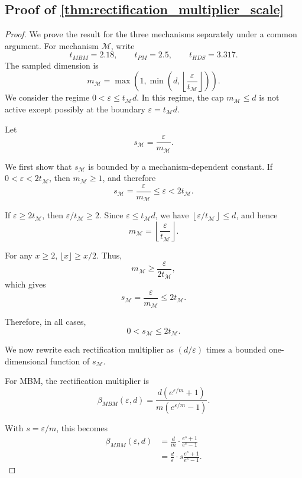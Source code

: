 \documentclass[conference,compsoc]{IEEEtran}
\theoremstyle{boldplain}
\theoremstyle{bolddefinition}
\theoremstyle{remark}
\newcommand{\mbmm}{MBM\xspace}
\newcommand{\pmm}{PM\xspace}
\newcommand{\hdsm}{HDS\xspace}
\begin{document}
\subsection{Proof of \autoref{thm:rectification_multiplier_scale}}
\label{app:proof_rectification_multiplier_scale}




\begin{proof}
We prove the result for the three mechanisms separately under a common
argument. For mechanism $\mathcal{M}$, write
$$
    t_{\mbmm}=2.18,\qquad
    t_{\pmm}=2.5,\qquad
    t_{\hdsm}=3.317.
$$
The sampled dimension is
$$
    m_{\mathcal{M}}
    =
    \max\left(1,\min\left(d,\left\lfloor\frac{\varepsilon}{t_{\mathcal{M}}}\right\rfloor\right)\right).
$$
We consider the regime $0<\varepsilon\leq t_{\mathcal{M}}d$. In this regime, the
cap $m_{\mathcal{M}}\leq d$ is not active except possibly at the boundary
$\varepsilon=t_{\mathcal{M}}d$.

Let
$$
    s_{\mathcal{M}}=\frac{\varepsilon}{m_{\mathcal{M}}}.
$$

We first show that $s_{\mathcal{M}}$ is bounded by a mechanism-dependent
constant. If $0<\varepsilon<2t_{\mathcal{M}}$, then $m_{\mathcal{M}}\geq 1$, and
therefore
$$
    s_{\mathcal{M}}
    =
    \frac{\varepsilon}{m_{\mathcal{M}}}
    \leq
    \varepsilon
    <
    2t_{\mathcal{M}}.
$$

If $\varepsilon\geq 2t_{\mathcal{M}}$, then
$\varepsilon/t_{\mathcal{M}}\geq 2$. Since $\varepsilon\leq t_{\mathcal{M}}d$,
we have $\left\lfloor\varepsilon/t_{\mathcal{M}}\right\rfloor\leq d$, and hence
$$
    m_{\mathcal{M}}
    =
    \left\lfloor\frac{\varepsilon}{t_{\mathcal{M}}}\right\rfloor.
$$

For any $x\geq 2$, $\lfloor x\rfloor\geq x/2$. Thus,
$$
    m_{\mathcal{M}}
    \geq
    \frac{\varepsilon}{2t_{\mathcal{M}}},
$$
which gives
$$
    s_{\mathcal{M}}
    =
    \frac{\varepsilon}{m_{\mathcal{M}}}
    \leq
    2t_{\mathcal{M}}.
$$

Therefore, in all cases,
$$
    0<s_{\mathcal{M}}\leq 2t_{\mathcal{M}}.
$$

We now rewrite each rectification multiplier as $(d/\varepsilon)$ times a bounded
one-dimensional function of $s_{\mathcal{M}}$.

For \mbmm, the rectification multiplier is
$$
    \beta_{\mbmm}(\varepsilon,d)
    =
    \frac{d(e^{\varepsilon/m}+1)}
    {m(e^{\varepsilon/m}-1)}.
$$

With $s=\varepsilon/m$, this becomes
$$
\begin{aligned}
    \beta_{\mbmm}(\varepsilon,d)
    &=
    \frac{d}{m}\cdot
    \frac{e^s+1}{e^s-1}  \\
    &=
    \frac{d}{\varepsilon}\cdot
    s\frac{e^s+1}{e^s-1}.
\end{aligned}
$$


\end{proof}
\end{document}
